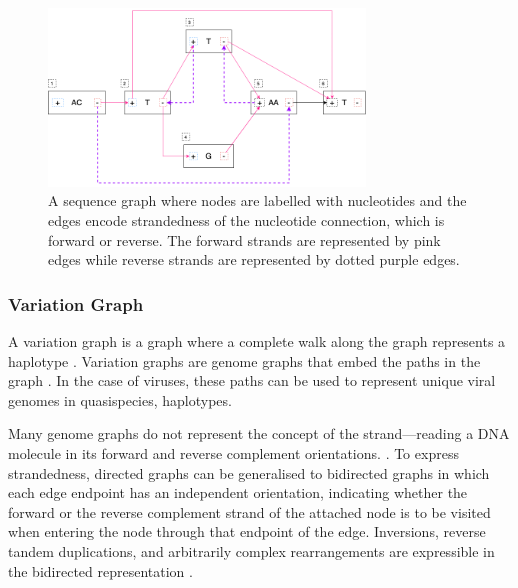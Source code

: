 \documentclass[10pt, a4paper]{article}
\begin{document}
\begin{figure}[h]
\centering
\includegraphics[width=0.75\textwidth]{../Figures/sequence-graph.png}
\caption[Sequence Graph]{\label{fig:org724e80a}A sequence graph where nodes are labelled with nucleotides and the edges encode strandedness of the nucleotide connection, which is forward or reverse. The forward strands are represented by pink edges while reverse strands are represented by dotted purple edges.}
\end{figure}

\subsubsection{Variation Graph}
\label{sec:org62868e7}
A variation graph is a graph where a complete walk along the graph represents a
haplotype \cite{patenGenomeGraphsEvolution2017}. Variation graphs are genome
graphs that embed the paths in the graph .
In the case of viruses, these paths can be used to represent unique viral
genomes in quasispecies, haplotypes. 

Many genome graphs do not represent the concept of the strand—reading a DNA
molecule in its forward and reverse complement orientations.
\cite{patenGenomeGraphsEvolution2017}. To express strandedness, directed graphs
can be generalised to bidirected graphs
\cite{edmondsMatchingWellSolvedClass2003,medvedevComputationalMethodsDiscovering2009}
in which each edge endpoint has an independent orientation, indicating whether
the forward or the reverse complement strand of the attached node is to be
visited when entering the node through that endpoint of the edge. Inversions,
reverse tandem duplications, and arbitrarily complex rearrangements are
expressible in the bidirected representation \cite{patenGenomeGraphsEvolution2017}.


\end{document}
